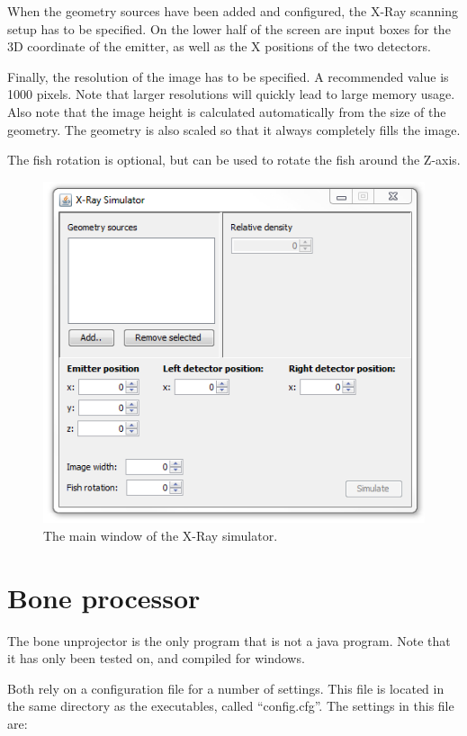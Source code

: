 When the geometry sources have been added and configured, the X-Ray scanning setup has to be specified. On the lower half of the screen are input boxes for the 3D coordinate of the emitter, as well as the X positions of the two detectors. 

Finally, the resolution of the image has to be specified. A recommended value is 1000 pixels. Note that larger resolutions will quickly lead to large memory usage. Also note that the image height is calculated automatically from the size of the geometry. The geometry is also scaled so that it always completely fills the image.

The fish rotation is optional, but can be used to rotate the fish around the Z-axis.

\begin{figure}
	\centering
	\includegraphics[width=120mm]{images/userGuide/simulator.png}
	\caption{The main window of the X-Ray simulator.}
	\label{fig:guide_simulator}
\end{figure}

\section{Bone processor}
The bone unprojector is the only program that is not a java program. Note that it has only been tested on, and compiled for windows.

Both rely on a configuration file for a number of settings. This file is located in the same directory as the executables, called ``config.cfg''. The settings in this file are:

